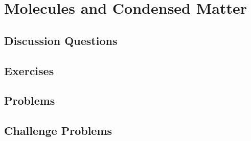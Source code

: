
\chapter{Molecules and Condensed Matter}

\section{Discussion Questions}

\section{Exercises}

\section{Problems}

\section{Challenge Problems}
